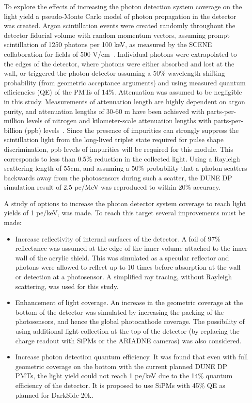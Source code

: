 \documentclass[a4paper,11pt]{article}
\begin{document}
To explore the effects of increasing the photon detection system coverage on the light yield a pseudo-Monte Carlo model of photon propagation in the detector was created. Argon scintillation events were created randomly throughout the detector fiducial volume with random momentum vectors, assuming prompt scintillation of 1250 photons per 100 keV, as measured by the SCENE collaboration for fields of 500 V/cm~\cite{cao2015measurement, cao2014study}. Individual photons were extrapolated to the edges of the detector, where photons were either absorbed and lost at the wall, or triggered the photon detector assuming a 50\% wavelength shifting probability (from geometric acceptance arguments) and using measured quantum efficiencies (QE) of the PMTs of 14\%. Attenuation was assumed to be negligible in this study. Measurements of attenuation length are highly dependent on argon purity, and attenuation lengths of 30-60 m have been achieved with parts-per-million levels of nitrogen and kilometer-scale attenuation lengths with parts-per-billion (ppb) levels~\cite{arAtten1}. Since the presence of impurities can strongly suppress the scintillation light from the long-lived triplet state required for pulse shape discrimination, ppb levels of impurities will be required for this module. This corresponds to less than 0.5\% reduction in the collected light. Using a Rayleigh scattering length of 55cm, and assuming a 50\% probability that a photon scatters backwards away from the photosensors during such a scatter, the DUNE DP simulation result of 2.5 pe/MeV was reproduced to within 20\% accuracy.

A study of options to increase the photon detector system coverage to reach light yields of 1 pe/keV, was made. To reach this target several improvements must be made:
\begin{itemize}
    \item Increase reflectivity of internal surfaces of the detector. A foil of 97\% reflectance was assumed at the edge of the inner volume attached to the inner wall of the acrylic shield. This was simulated as a specular reflector and photons were allowed to reflect up to 10 times before absorption at the wall or detection at a photosensor. A simplified ray tracing, without Rayleigh scattering, was used for this study.
    \item Enhancement of light coverage. An increase in the geometric coverage at the bottom of the detector was simulated by increasing the packing of the photosensors, and hence the global photocathode coverage. The possibility of using additional light collection at the top of the detector (by replacing the charge readout with SiPMs or the ARIADNE cameras) was also considered.
    \item Increase photon detection quantum efficiency. It was found that even with full geometric coverage on the bottom with the current planned DUNE DP PMTs, the light yield could not reach 1 pe/keV due to the 14\% quantum efficiency of the detector. It is proposed to use SiPMs with 45\% QE as planned for DarkSide-20k.
\end{itemize}
\end{document}

